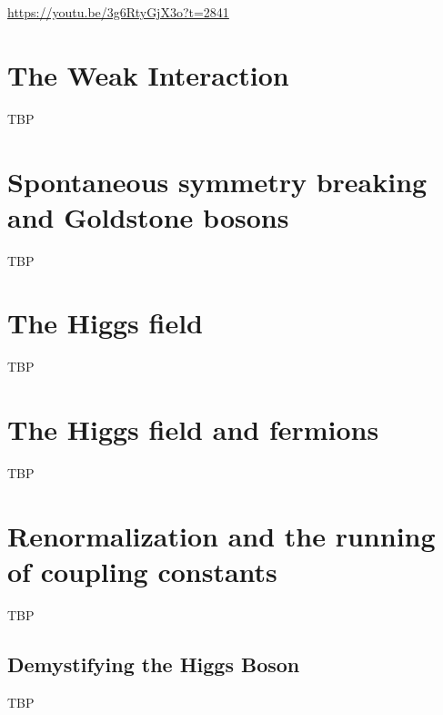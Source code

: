 \documentclass[]{article}
\begin{document}
\url{https://youtu.be/3g6RtyGjX3o?t=2841}

\section{The Weak Interaction}

TBP

\section{Spontaneous symmetry breaking and Goldstone bosons}

TBP

\section{The Higgs field}

TBP

\section{The Higgs field and fermions}

TBP

\section{Renormalization and the running of coupling constants}

TBP

\begin{appendices}
	\section{Demystifying the Higgs Boson}
	\cite{susskind2010demystifing}
	TBP
\end{appendices}


\raggedright

\end{document}
